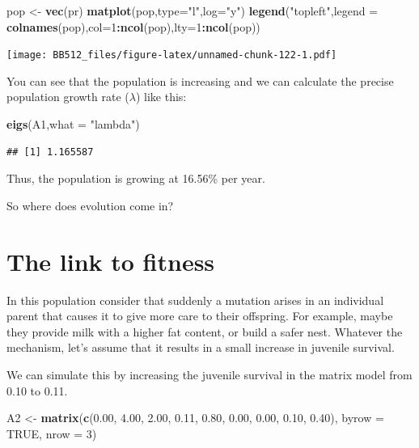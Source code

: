 \documentclass[
  a4paper]{book}
\newenvironment{Shaded}{\begin{snugshade}}{\end{snugshade}}
\newcommand{\AttributeTok}[1]{\textcolor[rgb]{0.13,0.29,0.53}{#1}}
\newcommand{\ConstantTok}[1]{\textcolor[rgb]{0.56,0.35,0.01}{#1}}
\newcommand{\DecValTok}[1]{\textcolor[rgb]{0.00,0.00,0.81}{#1}}
\newcommand{\FloatTok}[1]{\textcolor[rgb]{0.00,0.00,0.81}{#1}}
\newcommand{\FunctionTok}[1]{\textcolor[rgb]{0.13,0.29,0.53}{\textbf{#1}}}
\newcommand{\NormalTok}[1]{#1}
\newcommand{\OtherTok}[1]{\textcolor[rgb]{0.56,0.35,0.01}{#1}}
\newcommand{\SpecialCharTok}[1]{\textcolor[rgb]{0.81,0.36,0.00}{\textbf{#1}}}
\newcommand{\StringTok}[1]{\textcolor[rgb]{0.31,0.60,0.02}{#1}}
\begin{document}
\begin{Shaded}
\begin{Highlighting}[]
\NormalTok{pop }\OtherTok{\textless{}{-}} \FunctionTok{vec}\NormalTok{(pr)}
\FunctionTok{matplot}\NormalTok{(pop,}\AttributeTok{type=}\StringTok{"l"}\NormalTok{,}\AttributeTok{log=}\StringTok{"y"}\NormalTok{)}
\FunctionTok{legend}\NormalTok{(}\StringTok{"topleft"}\NormalTok{,}\AttributeTok{legend =} \FunctionTok{colnames}\NormalTok{(pop),}\AttributeTok{col=}\DecValTok{1}\SpecialCharTok{:}\FunctionTok{ncol}\NormalTok{(pop),}\AttributeTok{lty=}\DecValTok{1}\SpecialCharTok{:}\FunctionTok{ncol}\NormalTok{(pop))}
\end{Highlighting}
\end{Shaded}

\texttt{[image: BB512\_files/figure-latex/unnamed-chunk-122-1.pdf]}

You can see that the population is increasing and we can calculate the precise population growth rate (\(\lambda\)) like this:

\begin{Shaded}
\begin{Highlighting}[]
\FunctionTok{eigs}\NormalTok{(A1,}\AttributeTok{what =} \StringTok{"lambda"}\NormalTok{)}
\end{Highlighting}
\end{Shaded}

\begin{verbatim}
## [1] 1.165587
\end{verbatim}

Thus, the population is growing at 16.56\% per year.

So where does evolution come in?

\hypertarget{the-link-to-fitness}{%
\section{The link to fitness}\label{the-link-to-fitness}}

In this population consider that suddenly a mutation arises in an individual parent that causes it to give more care to their offspring. For example, maybe they provide milk with a higher fat content, or build a safer nest. Whatever the mechanism, let's assume that it results in a small increase in juvenile survival.

We can simulate this by increasing the juvenile survival in the matrix model from 0.10 to 0.11.

\begin{Shaded}
\begin{Highlighting}[]
\NormalTok{A2 }\OtherTok{\textless{}{-}} \FunctionTok{matrix}\NormalTok{(}\FunctionTok{c}\NormalTok{(}\FloatTok{0.00}\NormalTok{, }\FloatTok{4.00}\NormalTok{, }\FloatTok{2.00}\NormalTok{, }
               \FloatTok{0.11}\NormalTok{, }\FloatTok{0.80}\NormalTok{, }\FloatTok{0.00}\NormalTok{, }
               \FloatTok{0.00}\NormalTok{, }\FloatTok{0.10}\NormalTok{, }\FloatTok{0.40}\NormalTok{), }
            \AttributeTok{byrow =} \ConstantTok{TRUE}\NormalTok{, }\AttributeTok{nrow =} \DecValTok{3}\NormalTok{)}
\end{Highlighting}
\end{Shaded}
\end{document}

